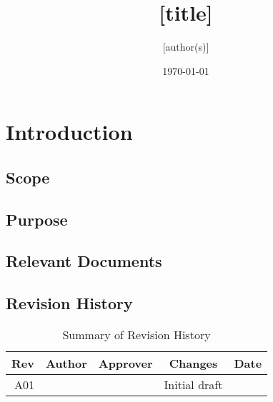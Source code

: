 \documentclass[12pt,article]{memoir}
\title{[title]}
\author{[author(s)]}
\date{\today}
\begin{document}
	


\tableofcontents*
\clearpage


\chapter{Introduction}
\section{Scope}

\section{Purpose}

\section{Relevant Documents}

\section{Revision History}
\begin{table}[H]
	\centering
	\begin{tabu}{r || c | c | c | c }
		Rev & Author & Approver & Changes & Date\\ \hline
		A01 & & & Initial draft & \\
	\end{tabu}
	\caption{Summary of Revision History}
	\label{tab:rev}
\end{table}

\end{document}
